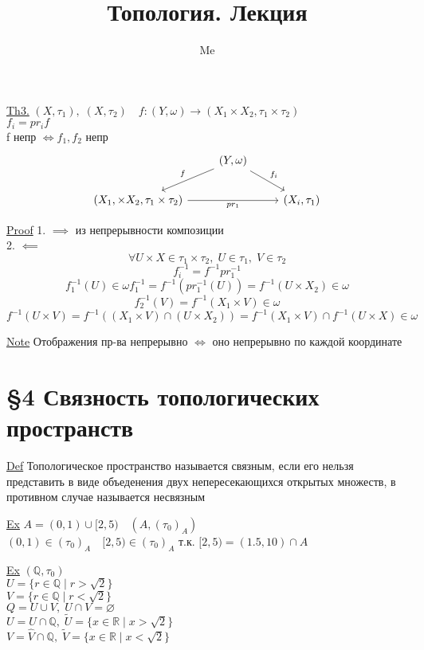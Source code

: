 \documentclass[a4paper]{article}
\begin{document}
\title{Топология. Лекция}
\author{Me}
\maketitle

\begin{tcolorbox}
\underline{Th3.} $ (X, \tau_1), \; (X, \tau_2) \quad
f: (Y, \omega)  \to (X_1 \times X_2, \tau_1 \times \tau_2) $\\
$ f_{i} = pr_i f $ \\
f непр $ \iff f_1, f_2$ непр 
\[
    \begin{tikzcd}
        & (Y, \omega) \arrow[swap]{dl}{f} \arrow{dr}{f_{i}}\\
        (X_1, \times X_2, \tau_1 \times \tau_2) \arrow[swap]{rr}{pr_1} &&(X_{i}, \tau_1)
    \end{tikzcd}
\]

\underline{Proof} 1. $ \implies $ из непрерывности композиции \\
2. $ \impliedby $ 
\[
    \forall U \times X \in \tau_1 \times \tau_2, \; U \in \tau_1, \; V \in \tau_2
\]
\[
    f^{-1}_{i} = f^{-1} pr^{-1}_1
\]
\[
    f_1^{-1}(U) \in \omega
    f^{-1}_1 = f^{-1}(pr_1^{-1}(U)) = f^{-1}(U \times X_2) \in \omega
\]
\[
    f_2^{-1}(V) = f^{-1}(X_1\times V) \in \omega
\]
\[
    f^{-1}(U\times V) = f^{-1}((X_1 \times V) \cap (U \times X_2)) =
    f^{-1}(X_1 \times V) \cap f^{-1}(U\times X) \in \omega
\]

\underline{Note} Отображения пр-ва непрерывно $ \iff $ оно непрерывно по каждой 
координате
\end{tcolorbox}

\section*{\centering \S 4 Связность топологических пространств}

\underline{Def} Топологическое пространство называется связным, если его нельзя
представить в виде объеденения двух непересекающихся открытых множеств, 
в противном случае называется несвязным

\underline{Ex} $ A = (0, 1) \cup [2, 5) \quad (A, (\tau_0)_{A})$\\
$ (0,1) \in (\tau_{0})_{A} \quad [2, 5) \in (\tau_{0})_{A} $ т.к. $ [2, 5) = (1.5, 10) \cap A $ 

\underline{Ex} $ (\mathbb{Q}, \tau_0) $ \\
$ U = \{ r \in \mathbb{Q} \; | \; r >\sqrt{2} \} $ \\
$ V = \{ r \in \mathbb{Q} \; | \; r <\sqrt{2} \} $ \\
$ Q = U \cup V, \; U \cap V = \varnothing $ \\
$ U = \hat{U} \cap \mathbb{Q}, \; \tilde{U} = \{ x \in \mathbb{R} \; | \; x > \sqrt{2} \} $ \\
$ V = \hat{V} \cap \mathbb{Q}, \; \tilde{V} = \{ x \in \mathbb{R} \; | \; x < \sqrt{2} \} $ 
\end{document}
